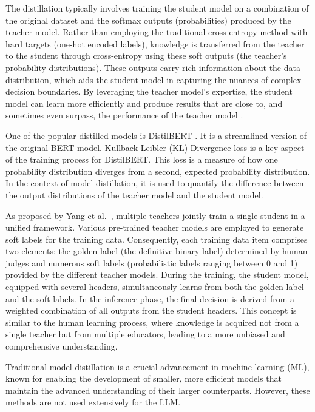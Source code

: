 The distillation typically involves training the student model on a combination of the original dataset and the softmax outputs (probabilities) produced by the teacher model. Rather than employing the traditional cross-entropy method with hard targets (one-hot encoded labels), knowledge is transferred from the teacher to the student through cross-entropy using these soft outputs (the teacher’s probability distributions). These outputs carry rich information about the data distribution, which aids the student model in capturing the nuances of complex decision boundaries. By leveraging the teacher model’s expertise, the student model can learn more efficiently and produce results that are close to, and sometimes even surpass, the performance of the teacher model \cite{distilling}.

One of the popular distilled models is DistilBERT \cite{distilbert}. It is a streamlined version of the original BERT model. Kullback-Leibler (KL) Divergence loss \cite{kl} is a key aspect of the training process for DistilBERT\@. This loss is a measure of how one probability distribution diverges from a second, expected probability distribution. In the context of model distillation, it is used to quantify the difference between the output distributions of the teacher model and the student model.

As proposed by Yang et al.\ \cite{multidistil}, multiple teachers jointly train a single student in a unified framework. Various pre-trained teacher models are employed to generate soft labels for the training data. Consequently, each training data item comprises two elements: the golden label (the definitive binary label) determined by human judges and numerous soft labels (probabilistic labels ranging between 0 and 1) provided by the different teacher models. During the training, the student model, equipped with several headers, simultaneously learns from both the golden label and the soft labels. In the inference phase, the final decision is derived from a weighted combination of all outputs from the student headers. This concept is similar to the human learning process, where knowledge is acquired not from a single teacher but from multiple educators, leading to a more unbiased and comprehensive understanding.

Traditional model distillation is a crucial advancement in machine learning (ML), known for enabling the development of smaller, more efficient models that maintain the advanced understanding of their larger counterparts. However, these methods are not used extensively for the LLM\@.

